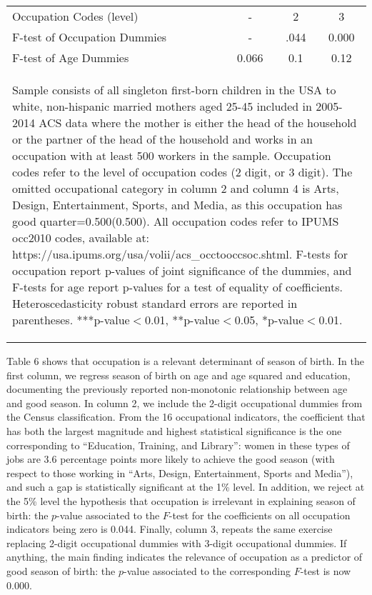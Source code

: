 \documentclass[a4paper, 12 pt]{article}
\theoremstyle{plain}
\begin{document}
\begin{doublespace}
\begin{table}[htbp]
{\begin{tabular}{l*{3}{c}}
Occupation Codes (level) &-&2&3\\
F-test of Occupation Dummies&-&.044&0.000\\
F-test of Age Dummies&0.066&0.1&0.12\\          \bottomrule
\multicolumn{4}{p{16.2cm}}{\begin{footnotesize}Sample consists of all
 singleton first-born children in the USA to white, non-hispanic
married mothers aged 25-45 included in 2005-2014 ACS data where the
mother is either the head of the household or the partner of the head
 of the household and works in an occupation with at least 500
workers in the sample. Occupation codes refer to the level of
occupation codes (2 digit, or 3 digit). The omitted occupational
category in column 2 and column 4 is Arts, Design, Entertainment,
Sports, and Media, as this occupation has good quarter=0.500(0.500).
 All occupation codes refer to IPUMS occ2010 codes, available at:
https://usa.ipums.org/usa/volii/acs\_occtooccsoc.shtml. F-tests for
occupation report p-values of joint significance of the dummies, and
F-tests for age report p-values for a test of equality of
coefficients. Heteroscedasticity robust standard errors are reported in              parentheses. ***p-value$<$0.01, **p-value$<$0.05, *p-value$<$0.01.
\end{footnotesize}}\end{tabular}}\end{table}


\newpage
Table 6 shows that occupation is a relevant determinant of season of birth. In the first column, we regress season of birth on age and age squared and education, documenting the previously reported non-monotonic relationship between age and good season. In column 2, we include the 2-digit occupational dummies from the Census classification. From the 16 occupational indicators, the coefficient that has both the largest magnitude and highest statistical significance is the one corresponding to ``Education, Training, and Library'': women in these types of jobs are 3.6 percentage points more likely to achieve the good season (with respect to those working in ``Arts, Design, Entertainment, Sports and Media''), and such a gap is statistically significant at the 1\% level. In addition, we reject at the 5\% level the hypothesis that occupation is irrelevant in explaining season of birth: the $p$-value associated to the $F$-test for the coefficients on all occupation indicators being zero is 0.044. Finally, column 3, repeats the same exercise replacing 2-digit occupational dummies with 3-digit occupational dummies. If anything, the main finding indicates the relevance of occupation as a predictor of good season of birth: the $p$-value associated to the corresponding $F$-test is now 0.000.



\end{doublespace}
\end{document}
